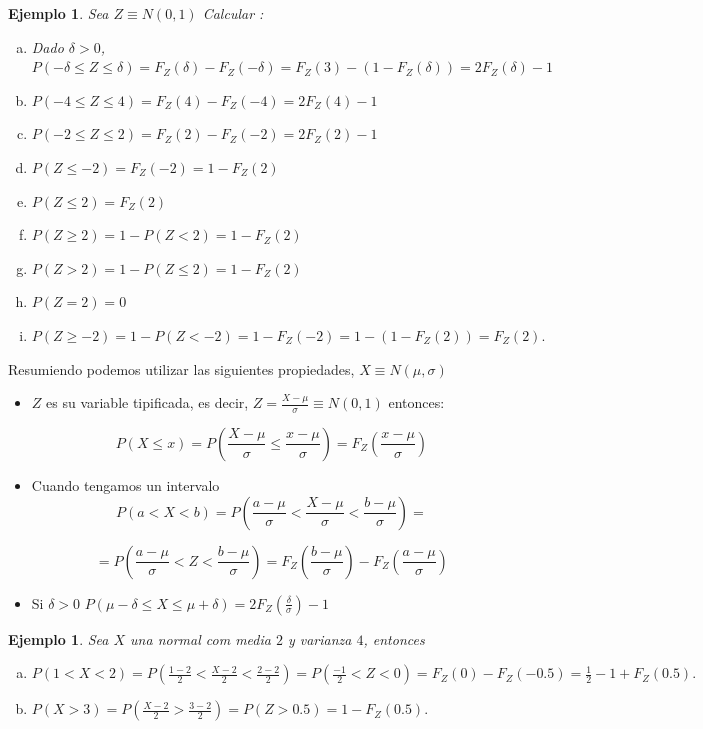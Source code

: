 \documentclass[12pt]{report}
\newtheorem{example}[definition]{Ejemplo}
\begin{document}
\begin{example} Sea $Z\equiv N(0,1)$  Calcular :
\begin{enumerate}[a)]
\item Dado $\delta>0$, $P(-\delta\leq Z \leq
\delta)=F_{Z}(\delta)-F_{Z}(-\delta)=F_Z(3)-(1-F_Z(\delta))=2 F_Z(\delta)-1$
\item $P(-4\leq Z \leq 4)=F_{Z}(4)-F_{Z}(-4)=2 F_Z(4)-1$
\item $P(-2\leq Z \leq 2)=F_{Z}(2)-F_{Z}(-2)=2 F_Z(2)-1$
\item $P(Z\leq -2)=F_Z(-2)=1-F_Z(2)$
\item $P( Z \leq 2)=F_{Z}(2)$
\item $P( Z \geq 2)=1-P(Z<2)=1-F_{Z}(2)$
\item $P( Z > 2)=1-P(Z\leq 2)=1-F_{Z}(2)$
\item $P( Z = 2)=0$
\item $P( Z \geq -2)=1-P(Z< -2)=1-F_{Z}(-2)=1-(1-F_Z(2))=F_Z(2).$
\end{enumerate}
\end{example}
    Resumiendo podemos utilizar las siguientes propiedades, $X\equiv N(\mu,\sigma)$
    \begin{itemize}
    \item  $Z$ es su variable tipificada, es decir,
    $Z=\frac{X-\mu}{\sigma}\equiv N(0,1)$ entonces:

    $$P(X\leq x)=P(\frac{X-\mu}{\sigma}\leq
    \frac{x-\mu}{\sigma})=F_{Z}(\frac{x-\mu}{\sigma})$$

   \item  Cuando tengamos un intervalo
    $$P(a<X<b)=P(\frac{a-\mu}{\sigma}<\frac{X-\mu}{\sigma}<\frac{b-\mu}{\sigma})=$$

    $$=P(\frac{a-\mu}{\sigma}<Z<\frac{b-\mu}{\sigma})=F_{Z}(\frac{b-\mu}{\sigma})-
    F_{Z}(\frac{a-\mu}{\sigma})$$
    \item Si $\delta>0$ $P(\mu-\delta\leq X \leq
\mu+\delta)=2 F_Z(\frac{\delta}{\sigma})-1$
\end{itemize}


    \begin{example}Sea $X$ una normal com media $2$ y varianza $4$, entonces
    \begin{enumerate}[a)]
\item  $P(1< X< 2)= P(\frac{1-2}{2}<\frac{X-2}{2}<\frac{2-2}{2})=
    P(\frac{-1}{2}<Z<0)=F_{Z}(0)-F_{Z}(-0.5)=\frac{1}{2}-1+F_{Z}(0.5).$
    \item $P(X>3)=P(\frac{X-2}{2}>\frac{3-2}{2})=
    P(Z>0.5)=1-F_{Z}(0.5).$
    \end{enumerate}
\end{example}
\end{document}
